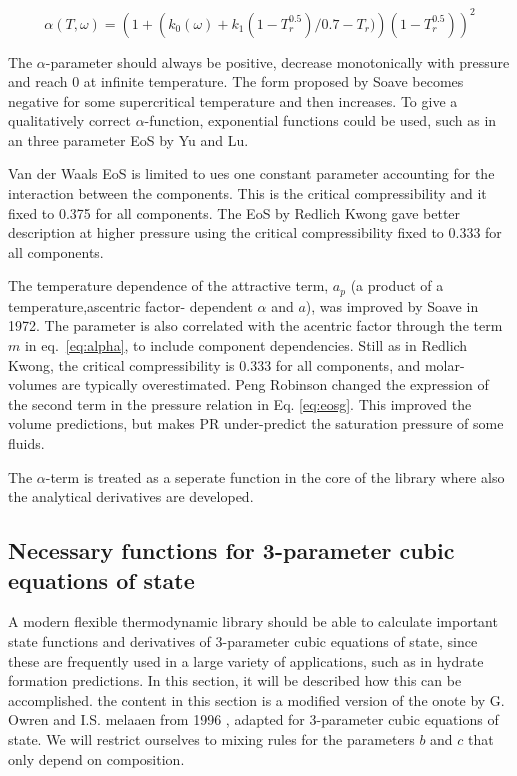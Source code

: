\documentclass[a4paper, 12pt, english, sintefheadings, sintefcolour]{sintefmemo}
\begin{document}
\begin{equation}
\alpha\left(T,\omega\right) =\left(1+\left(k_0(\omega)+k_1(1-T_r^{0.5})/0.7-T_r)\right)(1-T_r^{0.5})\right)^2
\end{equation}



The $\alpha$-parameter should always be positive, decrease monotonically with
pressure and reach 0 at infinite temperature. The form proposed by Soave
becomes negative for some supercritical temperature and then increases. To
give a qualitatively correct $\alpha$-function, exponential functions could be
used, such as in an three parameter EoS by Yu and Lu.

Van der Waals EoS is limited to ues one constant parameter accounting for the
interaction between the components. This is the critical compressibility and
it fixed to 0.375 for all components. The EoS by Redlich Kwong gave better
description at higher pressure using the critical compressibility fixed to
0.333 for all components. 

The temperature dependence of the attractive term, $a_p$ (a product of a
temperature,ascentric factor- dependent $\alpha$ and $a$), was improved by
Soave in 1972. The parameter is also correlated with the acentric factor
through the term $m$ in eq.~\ref{eq:alpha}, to include component
dependencies. Still as in Redlich Kwong, the critical compressibility is 0.333
for all components, and molar-volumes are typically overestimated. Peng
Robinson changed the expression of the second term in the pressure relation in
Eq. \ref{eq:eosg}. This improved the volume predictions, but makes PR
under-predict the saturation pressure of some fluids.

The $\alpha$-term is treated as a seperate function in the core of the library
where also the analytical derivatives are developed. 

\subsection{Necessary functions for 3-parameter cubic equations of state}
A modern flexible thermodynamic library should be able to calculate important
state functions and derivatives of 3-parameter cubic equations of state, since
these are frequently used in a large variety of applications, such as in
hydrate formation predictions. In this section, it will be described how this
can be accomplished. the content in this section is a modified version of the
onote by G. Owren and I.S. melaaen from 1996 \cite{Owren1996}, adapted for
3-parameter cubic equations of state. We will restrict ourselves to mixing
rules for the parameters $b$ and $c$ that only depend on composition.
\end{document}
